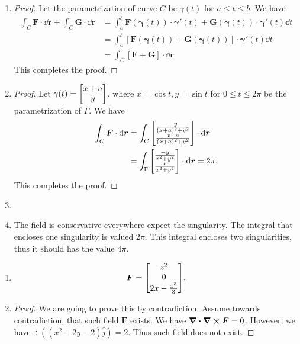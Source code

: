 \documentclass[8pt,twocolumn]{article}
\begin{document}
\begin{Answer}[number=41]
  \begin{enumerate}
    \item \begin{proof}
      Let the parametrization of curve $C$ be $\gamma(t)$ for $a\le t\le b$. We have
      \begin{align*}
        \int_{C} \bm{F}\cdot \dd{\bm{r}} + \int_{C} \bm{G}\cdot \dd{\bm{r}} &=
        \int_a^b \bm{F}(\bm{\gamma}(t)) \cdot \bm{\gamma}'(t) + \bm{G}(\bm{\gamma}(t)) \cdot \bm{\gamma}'(t) \dd{t} \\
        &= \int_a^b [\bm{F}(\bm{\gamma}(t)) + \bm{G}(\bm{\gamma}(t))] \cdot \bm{\gamma}'(t) \dd{t} \\
        &= \int_{C} [\bm{F} + \bm{G}]\cdot \dd{\bm{r}}
      \end{align*}
      This completes the proof.
    \end{proof}
    \item \begin{proof}
        Let $\gamma(t) = \mqty[x+a\\ y]$, where $x=\cos t, y=\sin t$ for $0\le
        t\le 2\pi$ be the parametrization of $\Gamma$. We have
        \begin{align*}
          \int_C \bm{F} \cdot \dd{\bm{r}} &= \int_C
          \mqty[\frac{-y}{(x+a)^2 + y^2}\\ \frac{x-a}{(x+a)^2 + y^2}] \cdot
          \dd{\bm{r}} \\
          &= \int_\Gamma \mqty[\frac{-y}{x^2 + y^2}\\ \frac{x}{x^2 + y^2}] \cdot
          \dd{\bm{r}} = 2\pi.
        \end{align*}
        This completes the proof.
    \end{proof}
    \item
    \item The field is conservative everywhere expect the singularity. The
      integral that encloses one singularity is valued $2\pi$. This integral
      encloses two singularities, thus it should has the value $4\pi$.
  \end{enumerate}
\end{Answer}

\begin{Answer}[number=42]
  \begin{enumerate}
    \item \[ \bm{F} = \mqty[z^2\\ 0\\ 2x - \frac{x^3}{3}]. \]
    \item \begin{proof}
      We are going to prove this by contradiction. Assume towards
      contradiction, that such field $\bm{F}$ exists. We have $\div\curl\bm{F}
      = 0$. However, we have $\div ((x^2+2y - 2)\hat{j})=2$. Thus such field
      does not exist.
    \end{proof}
  \end{enumerate}
\end{Answer}
\end{document}
